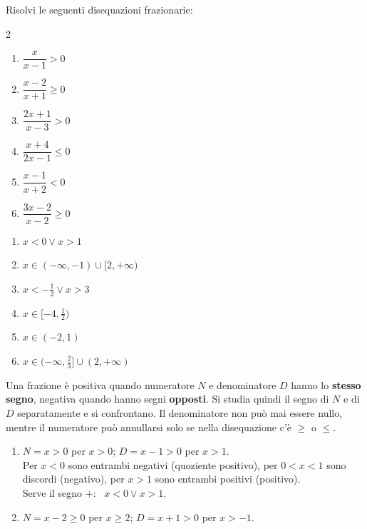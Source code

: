 
\begin{question}[ID=2.1, subtitle={Disequazioni frazionarie}, difficulty=facile, tags={disequazioni frazionarie}]
Risolvi le seguenti disequazioni frazionarie:
\begin{multicols}{2}
\begin{enumerate}[leftmargin=3.2cm]
    \item $\dfrac{x}{x-1} > 0$
    \item $\dfrac{x-2}{x+1} \geq 0$
    \item $\dfrac{2x+1}{x-3} > 0$
    \item $\dfrac{x+4}{2x-1} \leq 0$
    \item $\dfrac{x-1}{x+2} < 0$
    \item $\dfrac{3x-2}{x-2} \geq 0$
\end{enumerate}
\end{multicols}
\begin{solution}
\begin{enumerate}
    \item $x<0\vee x>1$
    \item $x\in(-\infty,-1)\cup[2,+\infty)$
    \item $x<-\tfrac12\vee x>3$
    \item $x\in[-4,\tfrac12)$
    \item $x\in(-2,1)$
    \item $x\in(-\infty,\tfrac23]\cup(2,+\infty)$
\end{enumerate}
\end{solution}
\begin{explanation}
Una frazione è positiva quando numeratore $N$ e denominatore $D$ hanno lo \textbf{stesso segno}, negativa quando hanno segni \textbf{opposti}. Si studia quindi il segno di $N$ e di $D$ separatamente e si confrontano. Il denominatore non può mai essere nullo, mentre il numeratore può annullarsi solo se nella disequazione c'è $\geq$ o $\leq$.
\begin{enumerate}
    \item $N=x>0$ per $x>0$; \quad $D=x-1>0$ per $x>1$. \\
    Per $x<0$ sono entrambi negativi (quoziente positivo), per $0<x<1$ sono discordi (negativo), per $x>1$ sono entrambi positivi (positivo). \\
    Serve il segno $+$: \ $x<0 \vee x>1$.
    \item $N=x-2\geq 0$ per $x\geq 2$; \quad $D=x+1>0$ per $x>-1$. \\

\end{enumerate}
\end{explanation}
\end{question}
